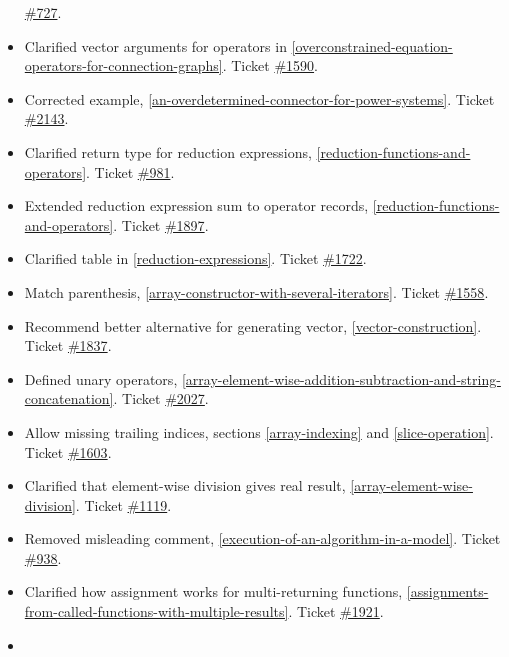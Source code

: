 \begin{itemize}
  \href{https://trac.modelica.org/Modelica/ticket/727}{\#727}.
\item
  Clarified vector arguments for operators in \autoref{overconstrained-equation-operators-for-connection-graphs}. Ticket
  \href{https://trac.modelica.org/Modelica/ticket/1590}{\#1590}.
\item
  Corrected example, \autoref{an-overdetermined-connector-for-power-systems}. Ticket
  \href{https://trac.modelica.org/Modelica/ticket/2143}{\#2143}.
\item
  Clarified return type for reduction expressions, \autoref{reduction-functions-and-operators}.
  Ticket \href{https://trac.modelica.org/Modelica/ticket/981}{\#981}.
\item
  Extended reduction expression sum to operator records, \autoref{reduction-functions-and-operators}.
  Ticket \href{https://trac.modelica.org/Modelica/ticket/1897}{\#1897}.
\item
  Clarified table in \autoref{reduction-expressions}. Ticket
  \href{https://trac.modelica.org/Modelica/ticket/1722}{\#1722}.
\item
  Match parenthesis, \autoref{array-constructor-with-several-iterators}. Ticket
  \href{https://trac.modelica.org/Modelica/ticket/1558}{\#1558}.
\item
  Recommend better alternative for generating vector, \autoref{vector-construction}.
  Ticket \href{https://trac.modelica.org/Modelica/ticket/1837}{\#1837}.
\item
  Defined unary operators, \autoref{array-element-wise-addition-subtraction-and-string-concatenation}. Ticket
  \href{https://trac.modelica.org/Modelica/ticket/2027}{\#2027}.
\item
  Allow missing trailing indices, sections \autoref{array-indexing} and \autoref{slice-operation}. Ticket
  \href{https://trac.modelica.org/Modelica/ticket/1603}{\#1603}.
\item
  Clarified that element-wise division gives real result, 
  \autoref{array-element-wise-division}. Ticket
  \href{https://trac.modelica.org/Modelica/ticket/1119}{\#1119}.
\item
  Removed misleading comment, \autoref{execution-of-an-algorithm-in-a-model}. Ticket
  \href{https://trac.modelica.org/Modelica/ticket/938}{\#938}.
\item
  Clarified how assignment works for multi-returning functions, 
  \autoref{assignments-from-called-functions-with-multiple-results}. Ticket
  \href{https://trac.modelica.org/Modelica/ticket/1921}{\#1921}.
\item

\end{itemize}
